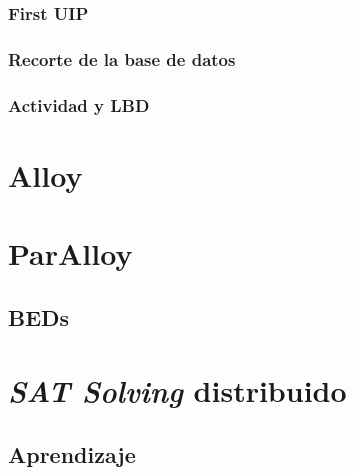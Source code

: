 \subsubsection{First UIP}
\subsubsection{Recorte de la base de datos}
\subsubsection{Actividad y LBD}

\section{Alloy}

\section{ParAlloy}
\subsection{BEDs}

\section{\emph{SAT Solving} distribuido}

\subsection{Aprendizaje}
